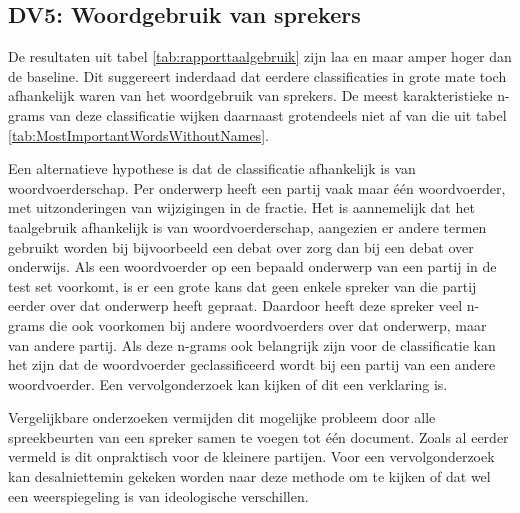 \subsection{DV5: Woordgebruik van sprekers}
De resultaten uit tabel \ref{tab:rapporttaalgebruik} zijn laa en maar amper hoger dan de baseline. Dit suggereert inderdaad dat eerdere classificaties in grote mate toch afhankelijk waren van het woordgebruik van sprekers. De meest karakteristieke n-grams van deze classificatie wijken daarnaast grotendeels niet af van die uit tabel \ref{tab:MostImportantWordsWithoutNames}.\par
Een alternatieve hypothese is dat de classificatie afhankelijk is van woordvoerderschap. Per onderwerp heeft een partij vaak maar één woordvoerder, met uitzonderingen van wijzigingen in de fractie. Het is aannemelijk dat het taalgebruik afhankelijk is van woordvoerderschap, aangezien er andere termen gebruikt worden bij bijvoorbeeld een debat over zorg dan bij een debat over onderwijs. Als een woordvoerder op een bepaald onderwerp van een partij in de test set voorkomt, is er een grote kans dat geen enkele spreker van die partij eerder over dat onderwerp heeft gepraat. Daardoor heeft deze spreker veel n-grams die ook voorkomen bij andere woordvoerders over dat onderwerp, maar van andere partij. Als deze n-grams ook belangrijk zijn voor de classificatie kan het zijn dat de woordvoerder geclassificeerd wordt bij een partij van een andere woordvoerder. Een vervolgonderzoek kan kijken of dit een verklaring is.\par
Vergelijkbare onderzoeken vermijden dit mogelijke probleem door alle spreekbeurten van een spreker samen te voegen tot één document. Zoals al eerder vermeld is dit onpraktisch voor de kleinere partijen. Voor een vervolgonderzoek kan desalniettemin gekeken worden naar deze methode om te kijken of dat wel een weerspiegeling is van ideologische verschillen.\par

